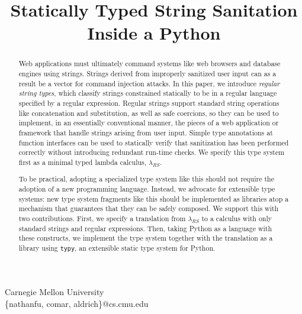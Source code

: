 \documentclass[10pt]{sigplanconf}
\theoremstyle{definition}
\begin{document}


\newcommand{\Ace}{\textsf{Ace}}

\permissiontopublish
{}
\title{Statically Typed String Sanitation Inside a Python}
          {Carnegie Mellon University \\ 
        \{nathanfu, comar, aldrich\}@cs.cmu.edu}
%

\maketitle
\begin{abstract}
Web applications must ultimately command systems like web browsers and database engines using strings. Strings derived from improperly sanitized user input  can as a result be a vector for command injection attacks. 
In this paper, we introduce \emph{regular string types}, which classify strings constrained statically to be in a regular language specified by a regular expression. Regular strings support standard string operations like concatenation and substitution, as well as safe coercions, so they  can be used to implement, in an essentially conventional manner, the pieces of a web application or framework that  handle strings arising from user input. Simple type annotations at function interfaces can be used to statically verify that sanitization has been performed correctly without introducing redundant run-time checks. We specify this type system first as a minimal typed lambda calculus, $\lambda_{RS}$.

To be practical, adopting a specialized type system like this should not require the adoption of a new programming language. Instead, we advocate for extensible type systems: new type system fragments like this should be implemented as libraries atop a mechanism that guarantees that they can be safely composed.  
We support this with two contributions. First, we specify a translation from $\lambda_{RS}$ to a calculus with only standard strings and regular expressions. Then, taking Python as a language with these constructs, we implement the type system together with the translation as a library using \texttt{typy}, an extensible static type system for Python.
\end{abstract}
\end{document}
